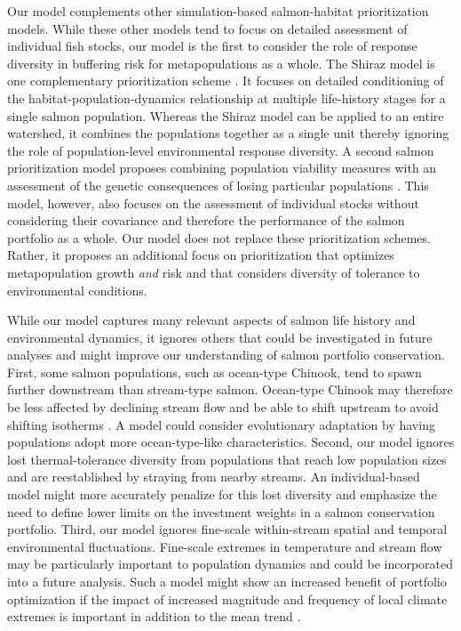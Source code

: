 \documentclass[12pt,english]{article}
\begin{document}
\begin{spacing}{1.9}
Our model complements other simulation-based salmon-habitat prioritization models. While these other models tend to focus on detailed assessment of individual fish stocks, our model is the first to consider the role of response diversity in buffering risk for metapopulations as a whole. The Shiraz model is one complementary prioritization scheme \citep{scheuerell2006}. It focuses on detailed conditioning of the habitat-population-dynamics relationship at multiple life-history stages for a single salmon population. Whereas the Shiraz model can be applied to an entire watershed, it combines the populations together as a single unit thereby ignoring the role of population-level environmental response diversity. A second salmon prioritization model proposes combining population viability measures with an assessment of the genetic consequences of losing particular populations \citep{allendorf1997}. This model, however, also focuses on the assessment of individual stocks without considering their covariance and therefore the performance of the salmon portfolio as a whole. Our model does not replace these prioritization schemes. Rather, it proposes an additional focus on prioritization that optimizes metapopulation growth \emph{and} risk and that considers diversity of tolerance to environmental conditions.

While our model captures many relevant aspects of salmon life history and environmental dynamics, it ignores others that could be investigated in future analyses and might improve our understanding of salmon portfolio conservation. First, some salmon populations, such as ocean-type Chinook, tend to spawn further downstream than stream-type salmon. Ocean-type Chinook may therefore be less affected by declining stream flow and be able to shift upstream to avoid shifting isotherms \citep{mantua2010}. A model could consider evolutionary adaptation by having populations adopt more ocean-type-like characteristics. Second, our model ignores lost thermal-tolerance diversity from populations that reach low population sizes and are reestablished by straying from nearby streams. An individual-based model might more accurately penalize for this lost diversity and emphasize the need to define lower limits on the investment weights in a salmon conservation portfolio. Third, our model ignores fine-scale within-stream spatial and temporal environmental fluctuations. Fine-scale extremes in temperature and stream flow may be particularly important to population dynamics \citep{mantua2010} and could be incorporated into a future analysis. Such a model might show an increased benefit of portfolio optimization if the impact of increased magnitude and frequency of local climate extremes is important in addition to the mean trend \citep{jentsch2007}.


\end{spacing}
\end{document}

